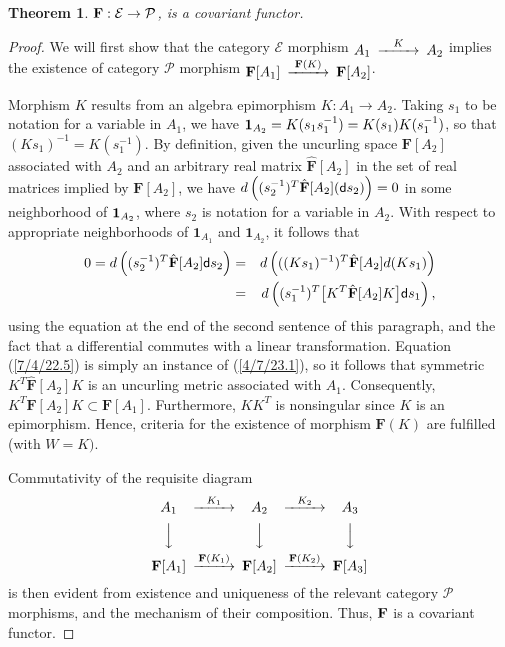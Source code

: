 \documentclass{amsart}
\numberwithin{equation}{section}
\newtheorem{theorem}{Theorem}
\theoremstyle{definition}
\numberwithin{theorem}{section}
\begin{document}
\begin{theorem}\label{6/13/22.1}  ${\bf F}: \mathcal{E}\rightarrow \mathcal{P}$, is a covariant functor. 
 \end{theorem}
 \begin{proof}
We will first show that the category $\mathcal{E}$ morphism $ \begin{CD}  A_1 @>K>> A_2\end{CD}$ implies the existence of category $\mathcal{P}$ morphism $ \begin{CD}  {\bf F}[A_1] @>{\bf F}(K)>> {\bf F}[A_2]\end{CD}$.

Morphism $K$ results from an algebra epimorphism $K:A_1\rightarrow A_2$.   Taking $s_1$ to be notation for a variable in $A_1$, we have ${\bf 1}_{A_2} = K(s_1s_1^{-1}) = K(s_1)K(s_1^{-1})$, so that $(Ks_1)^{-1} = K(s_1^{-1})$.  By definition, given the uncurling space $\mathbf{F}[A_2]$ associated with $A_2$ and an arbitrary real matrix  $\hat{\mathbf{F}}[A_2]$ in the set of real matrices implied by $\mathbf{F}[A_2]$, we have $d\left((s_2^{-1})^T\hat{\mathbf{F}}[A_2] ({\sf d}s_2)\right) = 0$ in some neighborhood of ${\bf 1}_{A_2}$, where $s_2$ is notation for a variable in $A_2$.   With respect to appropriate neighborhoods of $\mathbf{1}_{A_1}$ and $\mathbf{1}_{A_2}$, it follows that \begin{eqnarray}\nonumber 0 = d\left((s_2^{-1})^T\hat{\mathbf{F}}[A_2] {\sf d}s_2\right) &=&  d\left(((Ks_1)^{-1})^T\hat{\mathbf{F}}[A_2] d(Ks_1)\right) \\  &=& d\left((s_1^{-1})^T \big[K^T \hat{\mathbf{F}}[A_2]K\big]{\sf d}s_1\right), \label{7/4/22.5}  \end{eqnarray}   using the equation at the end of the second sentence of this paragraph, and the fact that a differential commutes with a linear transformation.  Equation (\ref{7/4/22.5}) is simply an instance of (\ref{4/7/23.1}), so it follows that symmetric $K^T \hat{\mathbf{F}}[A_2]K$ is an uncurling metric associated with $A_1$.  Consequently, $K^T\mathbf{F}[A_2]K\subset \mathbf{F}[A_1]$.  Furthermore, $KK^T$ is nonsingular since $K$ is an epimorphism.  Hence, criteria for the existence of morphism $\mathbf{F}(K)$ are fulfilled (with $W=K)$.

Commutativity of the requisite diagram 
  \[  \begin{CD}  
A_1 @>K_1>> A_2 @>K_2>> A_3\\
 @VVV   @VVV  @VVV\\
 {\bf F}[A_1]   @>{\bf F}(K_1)>>  {\bf F}[A_2]  @>{\bf F}(K_2)>>  {\bf F}[A_3] \\ 
 \end{CD} \]
is then evident from existence and uniqueness of the relevant category $\mathcal{P}$ morphisms, and the mechanism of their composition.  Thus, ${\bf F}$ is a covariant functor. 
\end{proof}
\end{document}
